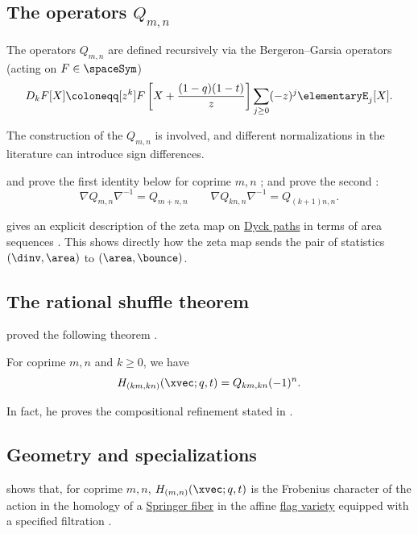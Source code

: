 \subsection[hikitaOperators]{The operators $Q_{m,n}$}

The operators $Q_{m,n}$ are defined recursively via the
Bergeron--Garsia operators \label{bergeronGarsiaOperator}
(acting on $F \in \spaceSym$)
\[
D_k F[X] \coloneqq [z^k] F\left[ X + \frac{(1-q)(1-t)}{z} \right] \sum_{j \geq 0}
(-z)^j \elementaryE_j[X].
\]

The construction of the $Q_{m,n}$ is involved, and different normalizations
in the literature can introduce sign differences.

 and  prove the first identity
below for coprime $m,n$ \cite{GorskyNegut2015};  and
 prove the second \cite{QiuRemmel2018x}:
\[
 \nabla Q_{m,n} \nabla^{-1} = Q_{m+n,n} \qquad
 \nabla Q_{kn,n} \nabla^{-1} = Q_{(k+1)n,n}.
\]

 gives an explicit description of the zeta map on
\hyperref[qtCatalan]{Dyck paths} in terms of area sequences
\cite{Pons2022x}.  This shows directly how
the zeta map sends the pair of statistics
$(\dinv,\area)$ to $(\area,\bounce)$.


\subsection[rationalShuffleTheorem]{The rational shuffle theorem}

 proved the following theorem \cite{Mellit2016x}.
\begin{theorem}
For coprime $m,n$ and $k \geq 0$, we have
\[
 H_{(km,kn)}(\xvec;q,t) =  Q_{km,kn} (-1)^n.
\]
\end{theorem}
In fact, he proves the compositional refinement
stated in \cite[Conj.~3.3]{BergeronGarsiaLevenXin2015}.


\subsection[hikitaGeometrySpecializations]{Geometry and specializations}

 shows that, for coprime $m,n$, $H_{(m,n)}(\xvec;q,t)$
is the Frobenius character of the action in the homology of a
\hyperref[springerFibers]{Springer fiber} in the affine
\hyperref[flagVarieties]{flag variety} equipped
with a specified filtration \cite{Hikita2014}.


